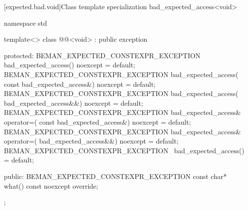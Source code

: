 [expected.bad.void]{Class template specialization bad_expected_access<void>}

\begin{codeblock}
namespace std {
  template<>
  class @@<void> : public exception {
  protected:
    BEMAN_EXPECTED_CONSTEXPR_EXCEPTION bad_expected_access() noexcept = default;
    BEMAN_EXPECTED_CONSTEXPR_EXCEPTION bad_expected_access(
        const bad_expected_access&) noexcept = default;
    BEMAN_EXPECTED_CONSTEXPR_EXCEPTION bad_expected_access(
        bad_expected_access&&) noexcept = default;
    BEMAN_EXPECTED_CONSTEXPR_EXCEPTION bad_expected_access& operator=(
        const bad_expected_access&) noexcept = default;
    BEMAN_EXPECTED_CONSTEXPR_EXCEPTION bad_expected_access& operator=(
        bad_expected_access&&) noexcept = default;
    BEMAN_EXPECTED_CONSTEXPR_EXCEPTION ~bad_expected_access() = default;

  public:
    BEMAN_EXPECTED_CONSTEXPR_EXCEPTION const char* what() const noexcept override;
  };
}
\end{codeblock}
